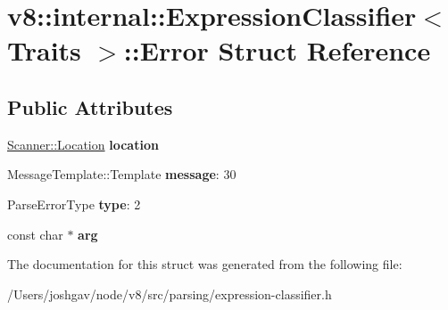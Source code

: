 \hypertarget{structv8_1_1internal_1_1_expression_classifier_1_1_error}{}\section{v8\+:\+:internal\+:\+:Expression\+Classifier$<$ Traits $>$\+:\+:Error Struct Reference}
\label{structv8_1_1internal_1_1_expression_classifier_1_1_error}
\subsection*{Public Attributes}
\begin{DoxyCompactItemize}
\item 
\hyperlink{structv8_1_1internal_1_1_scanner_1_1_location}{Scanner\+::\+Location} {\bfseries location}\hypertarget{structv8_1_1internal_1_1_expression_classifier_1_1_error_a39e648b508770b4d26c79566e1c71eef}{}\label{structv8_1_1internal_1_1_expression_classifier_1_1_error_a39e648b508770b4d26c79566e1c71eef}

\item 
Message\+Template\+::\+Template {\bfseries message}\+: 30\hypertarget{structv8_1_1internal_1_1_expression_classifier_1_1_error_a451afeefd7b4320e8b26a3405c11ddfb}{}\label{structv8_1_1internal_1_1_expression_classifier_1_1_error_a451afeefd7b4320e8b26a3405c11ddfb}

\item 
Parse\+Error\+Type {\bfseries type}\+: 2\hypertarget{structv8_1_1internal_1_1_expression_classifier_1_1_error_a168173a7d2e6ac65039b1df0b308626e}{}\label{structv8_1_1internal_1_1_expression_classifier_1_1_error_a168173a7d2e6ac65039b1df0b308626e}

\item 
const char $\ast$ {\bfseries arg}\hypertarget{structv8_1_1internal_1_1_expression_classifier_1_1_error_a27581c94a0b66701f8fb6f3adb45836a}{}\label{structv8_1_1internal_1_1_expression_classifier_1_1_error_a27581c94a0b66701f8fb6f3adb45836a}

\end{DoxyCompactItemize}


The documentation for this struct was generated from the following file\+:\begin{DoxyCompactItemize}
\item 
/\+Users/joshgav/node/v8/src/parsing/expression-\/classifier.\+h\end{DoxyCompactItemize}
